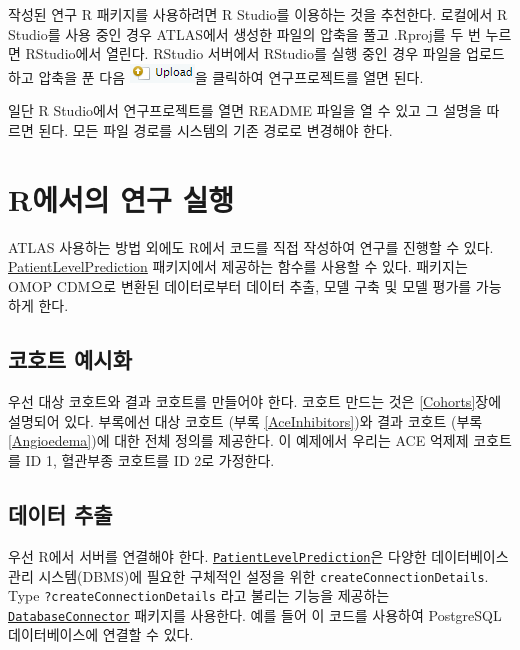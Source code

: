 \documentclass[10.5pt]{book}
\theoremstyle{definition}
\theoremstyle{definition}
\theoremstyle{definition}
\theoremstyle{remark}
\begin{document}
작성된 연구 R 패키지를 사용하려면 R Studio를 이용하는 것을 추천한다.
로컬에서 R Studio를 사용 중인 경우 ATLAS에서 생성한 파일의 압축을 풀고
.Rproj를 두 번 누르면 RStudio에서 열린다. RStudio 서버에서 RStudio를
실행 중인 경우 파일을 업로드하고 압축을 푼 다음
\includegraphics{images/PopulationLevelEstimation/upload.png}을 클릭하여
연구프로젝트를 열면 된다.

일단 R Studio에서 연구프로젝트를 열면 README 파일을 열 수 있고 그 설명을
따르면 된다. 모든 파일 경로를 시스템의 기존 경로로 변경해야 한다.

\section{R에서의 연구 실행}\label{r--}

ATLAS 사용하는 방법 외에도 R에서 코드를 직접 작성하여 연구를 진행할 수
있다.
\href{https://ohdsi.github.io/PatientLevelPrediction/}{PatientLevelPrediction}
패키지에서 제공하는 함수를 사용할 수 있다. 패키지는 OMOP CDM으로 변환된
데이터로부터 데이터 추출, 모델 구축 및 모델 평가를 가능하게 한다.

\subsection{코호트 예시화}\label{-}

우선 대상 코호트와 결과 코호트를 만들어야 한다. 코호트 만드는 것은
\ref{Cohorts}장에 설명되어 있다. 부록에선 대상 코호트 (부록
\ref{AceInhibitors})와 결과 코호트 (부록 \ref{Angioedema})에 대한 전체
정의를 제공한다. 이 예제에서 우리는 ACE 억제제 코호트를 ID 1, 혈관부종
코호트를 ID 2로 가정한다.

\subsection{데이터 추출}\label{--2}

우선 R에서 서버를 연결해야 한다.
\href{https://ohdsi.github.io/PatientLevelPrediction/}{\texttt{PatientLevelPrediction}}은
다양한 데이터베이스 관리 시스템(DBMS)에 필요한 구체적인 설정을 위한
\texttt{createConnectionDetails}. Type \texttt{?createConnectionDetails}
라고 불리는 기능을 제공하는
\href{https://ohdsi.github.io/DatabaseConnector/}{\texttt{DatabaseConnector}}
패키지를 사용한다. 예를 들어 이 코드를 사용하여 PostgreSQL
데이터베이스에 연결할 수 있다.
\end{document}
